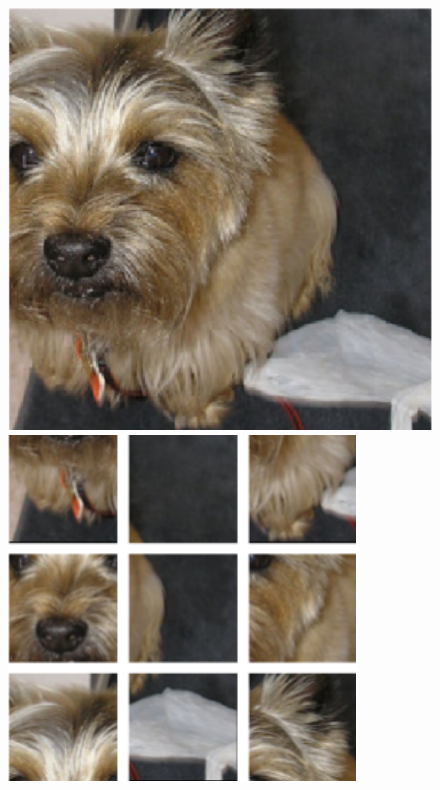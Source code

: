 \documentclass{article}
\begin{document}
\begin{figure}
    \begin{minipage}{\textwidth}
        \begin{minipage}{.49\textwidth}
            \begin{minipage}{.49\textwidth}
                \centering
                \includegraphics[width=\textwidth]{origin_color}
            \end{minipage}
            \begin{minipage}{.49\textwidth}
                \centering
                \includegraphics[width=\textwidth]{puzzle_color}

\end{minipage}
\end{minipage}
\end{minipage}
\end{figure}
\end{document}
